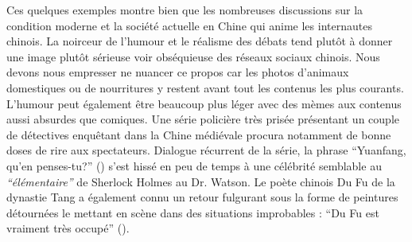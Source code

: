 Ces quelques exemples montre bien que les nombreuses discussions sur la condition moderne et la société actuelle en Chine qui anime les internautes chinois. La noirceur de l'humour et le réalisme des débats tend plutôt à donner une image plutôt sérieuse voir obséquieuse des réseaux sociaux chinois. Nous devons nous empresser ne nuancer ce propos car les photos d'animaux domestiques ou de nourritures y restent avant tout les contenus les plus courants. L'humour peut également être beaucoup plus léger avec des mèmes aux contenus aussi absurdes que comiques. Une série policière très prisée présentant un couple de détectives enquêtant dans la Chine médiévale procura notamment de bonne doses de rire aux spectateurs. Dialogue récurrent de la série, la phrase ``Yuanfang, qu'en penses-tu?'' () s'est hissé en peu de temps à une célébrité semblable au \textit{``élémentaire''} de Sherlock Holmes au Dr. Watson. Le poète chinois Du Fu de la dynastie Tang a également connu un retour fulgurant sous la forme de peintures détournées le mettant en scène dans des situations improbables : ``Du Fu est vraiment très occupé'' (). 

